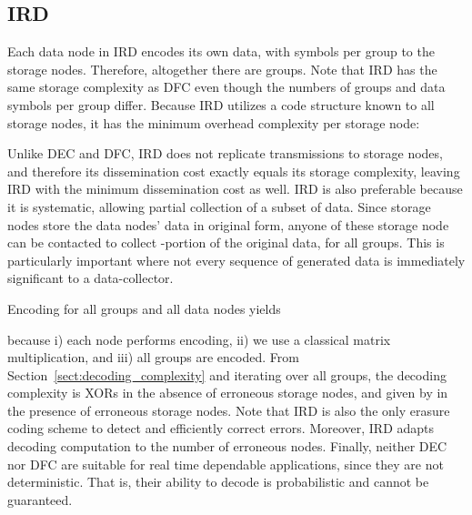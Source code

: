 \documentclass[10pt,journal,letterpaper,compsoc]{IEEEtran}
\newcommand{\0}{{\bf 0}}
\begin{document}
\subsection{IRD}
Each data  node in IRD encodes its own data, with  symbols per group to the  storage nodes. Therefore, altogether there are 
 groups. Note that IRD has the same storage complexity as DFC even though the numbers of groups and data symbols per group differ. Because IRD utilizes a code structure known to all storage nodes, it has the minimum overhead complexity per storage node:


Unlike DEC and DFC, IRD does not replicate transmissions to storage nodes, and therefore its dissemination cost exactly equals its storage complexity, leaving IRD with the minimum dissemination cost as well.  
IRD is also preferable because it is systematic, allowing partial collection of a subset of data. Since  storage nodes store the data nodes' data in original form, anyone of these  storage node can be contacted to collect -portion of the original data, for all  groups. This is particularly important where not every sequence of generated data is immediately significant to a data-collector.

Encoding for all groups and all data  nodes yields

because i) each node performs encoding, ii) we use a classical matrix multiplication, and iii) all groups are encoded.
From Section~\ref{sect:decoding_complexity} and iterating over all groups, the decoding complexity is  XORs in the absence of erroneous storage nodes, and given by
 in the presence of  erroneous storage nodes. Note that IRD is also the only erasure coding scheme to detect and efficiently correct errors. Moreover, IRD adapts decoding computation to the number of erroneous nodes. Finally, neither DEC nor DFC are suitable for real time dependable applications, since they are not deterministic. That is, their ability to decode is probabilistic and cannot be guaranteed.
\end{document}

